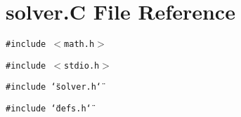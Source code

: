 \section{solver.C File Reference}
\label{solver_C}
{\tt \#include $<$math.h$>$}\par
{\tt \#include $<$stdio.h$>$}\par
{\tt \#include \char`\"{}solver.h\char`\"{}}\par
{\tt \#include \char`\"{}defs.h\char`\"{}}\par

